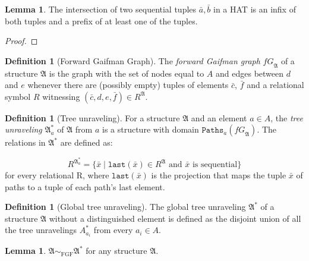 \documentclass[draft]{scrartcl}
\theoremstyle{definition}
\newtheorem{definition}[theorem]{Definition}
\newtheorem{lemma}[theorem]{Lemma}
\newcommand{\last}[1]{\mathtt{last}(#1)}
\begin{document}
\begin{lemma}\label{lemma-seq-intersection}
The intersection of two sequential tuples $\bar{a}, \bar{b}$ in a HAT is an infix of both tuples and a prefix of at least one of the tuples.
\end{lemma}

\begin{proof}
\end{proof}

\begin{definition}[Forward Gaifman Graph]
The \emph{forward Gaifman graph} $\mathit{fG}_\mathfrak{A}$ of a structure $\mathfrak{A}$ is the graph with the set of nodes equal to $A$ and edges between $d$ and $e$ whenever there are (possibly empty) tuples of elements $\bar{c}$, $\bar{f}$ and a relational symbol $R$ witnessing $(\bar{c}, d, e, \bar{f}) \in R^{\mathfrak{A}}$.
\end{definition}

\begin{definition}[Tree unraveling]
For a structure $\mathfrak{A}$ and an element $a \in A$, the \emph{tree unraveling} $\mathfrak{A}^*_a$ of $\mathfrak{A}$ from $a$ is a structure with domain $\mathtt{Paths}_a(\mathit{fG}_\mathfrak{A})$. The relations in $\mathfrak{A}^*$ are defined as:

\[
R^{\mathfrak{A}^*_a} = \{ \bar{x} \mid \text{$\last{\bar{x}} \in R^{\mathfrak{A}}$ and $\bar{x}$ is sequential} \}
\]
for every relational R, where $\last{\bar{x}}$ is the projection that maps the tuple $\bar{x}$ of paths to a tuple of each path's last element.
\end{definition}

\begin{definition}[Global tree unraveling]
The global tree unraveling $\mathfrak{A}^*$ of a structure $\mathfrak{A}$ without a distinguished element is defined as the disjoint union of all the tree unravelings $A^*_{a_i}$ from every $a_i \in A$.
\end{definition}

\begin{lemma}
$\mathfrak{A} \sim_{\textrm{FGF}} \mathfrak{A}^*$ for any structure $\mathfrak{A}$.
\end{lemma}
\end{document}
